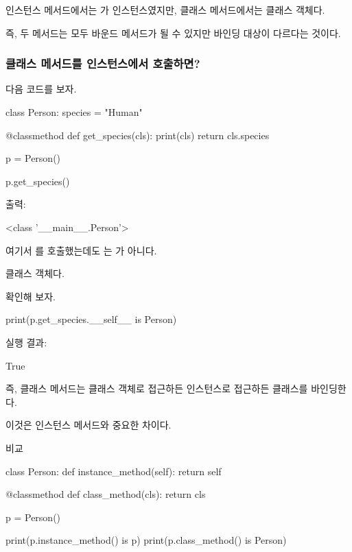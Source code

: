 인스턴스 메서드에서는 가 인스턴스였지만, 클래스 메서드에서는 클래스 객체다.

즉, 두 메서드는 모두 바운드 메서드가 될 수 있지만 바인딩 대상이 다르다는 것이다.

\subsubsection{클래스 메서드를 인스턴스에서 호출하면?}

다음 코드를 보자.

\begin{dhkcode}
class Person:
    species = "Human"

    @classmethod
    def get_species(cls):
        print(cls)
        return cls.species

p = Person()

p.get_species()
\end{dhkcode}

출력:

\begin{dhkzsh}
<class '__main__.Person'>
\end{dhkzsh}

여기서 를 호출했는데도 는 가 아니다.

 클래스 객체다.

확인해 보자.

\begin{dhkcode}
print(p.get_species.__self__ is Person)
\end{dhkcode}

실행 결과:

\begin{dhkzsh}
True
\end{dhkzsh}

즉, 클래스 메서드는 클래스 객체로 접근하든 인스턴스로 접근하든 클래스를 바인딩한다.

이것은 인스턴스 메서드와 중요한 차이다.

\begin{dhknote}
\begin{dhksmry}[centered]
비교
\end{dhksmry}
\end{dhknote}

\begin{dhkcode}
class Person:
    def instance_method(self):
        return self

    @classmethod
    def class_method(cls):
        return cls

p = Person()

print(p.instance_method() is p)
print(p.class_method() is Person)
\end{dhkcode}

